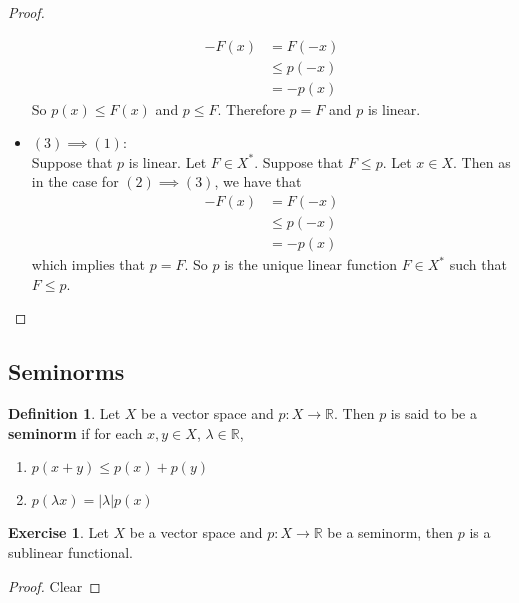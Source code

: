 \documentclass[12pt]{amsart}
\theoremstyle{definition}
\newtheorem{defn}[definition]{Definition}
\newtheorem{ex}[definition]{Exercise}
\newcommand{\lam}{\lambda}
\newcommand{\R}{\mathbb{R}}
\newcommand{\lex}[1]{\label{ex:#1}}
\newcommand{\ld}[1]{\label{defn:#1}}
\begin{document}
\begin{proof}
\begin{itemize}
			\begin{align*}
				-F(x) 
				&= F(-x) \\
				& \leq p(-x) \\
				&= -p(x)
			\end{align*}	
			So $p(x) \leq F(x)$ and $p \leq F$. Therefore $p = F$ and $p$ is linear.  
			\item $(3) \implies (1)$: \\ 
			Suppose that $p$ is linear. Let $F \in X^*$. Suppose that $F \leq p$. Let $x \in X$. Then as in the case for $(2) \implies (3)$, we have that
			\begin{align*}
				-F(x) 
				&= F(-x) \\
				& \leq p(-x) \\
				&= -p(x)
			\end{align*}	 
			which implies that $p = F$. So $p$ is the unique linear function $F \in X^*$ such that $F \leq p$.
		\end{itemize}
	\end{proof}
	






















	\newpage
	\subsection{Seminorms}
	\begin{defn} \ld{55005}
		Let $X$ be a vector space and $p:X \rightarrow \R$. Then $ p$ is said to be a \textbf{seminorm} if for each $x,y \in X$, $\lam \in \R$, 
		\begin{enumerate}
			\item $p(x+y) \leq p(x) + p(y)$
			\item $p(\lam x) = |\lam| p(x)$
		\end{enumerate}  
	\end{defn}
	
	\begin{ex} \lex{55006}
		Let $X$ be a vector space and $p: X \rightarrow \R$ be a seminorm, then $p$ is a sublinear functional.
	\end{ex}
	
	\begin{proof}
		Clear
	\end{proof}
\end{document}

